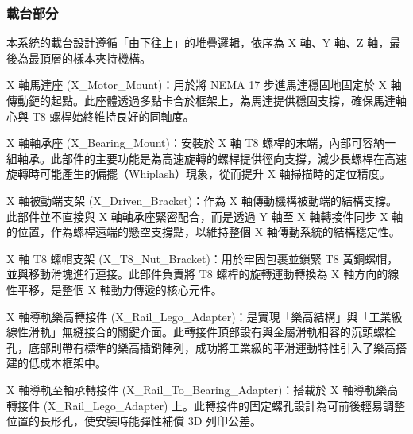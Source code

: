 
\subsubsection{載台部分}

本系統的載台設計遵循「由下往上」的堆疊邏輯，依序為 X 軸、Y 軸、Z 軸，最後為最頂層的樣本夾持機構。

X 軸馬達座 (X\_Motor\_Mount)：用於將 NEMA 17 步進馬達穩固地固定於 X 軸傳動鏈的起點。此座體透過多點卡合於框架上，為馬達提供穩固支撐，確保馬達軸心與 T8 螺桿始終維持良好的同軸度。

X 軸軸承座 (X\_Bearing\_Mount)：安裝於 X 軸 T8 螺桿的末端，內部可容納一組軸承。此部件的主要功能是為高速旋轉的螺桿提供徑向支撐，減少長螺桿在高速旋轉時可能產生的偏擺（Whiplash）現象，從而提升 X 軸掃描時的定位精度。

X 軸被動端支架 (X\_Driven\_Bracket)：作為 X 軸傳動機構被動端的結構支撐。此部件並不直接與 X 軸軸承座緊密配合，而是透過 Y 軸至 X 軸轉接件同步 X 軸的位置，作為螺桿遠端的懸空支撐點，以維持整個 X 軸傳動系統的結構穩定性。

X 軸 T8 螺帽支架 (X\_T8\_Nut\_Bracket)：用於牢固包裹並鎖緊 T8 黃銅螺帽，並與移動滑塊進行連接。此部件負責將 T8 螺桿的旋轉運動轉換為 X 軸方向的線性平移，是整個 X 軸動力傳遞的核心元件。

X 軸導軌樂高轉接件 (X\_Rail\_Lego\_Adapter)：是實現「樂高結構」與「工業級線性滑軌」無縫接合的關鍵介面。此轉接件頂部設有與金屬滑軌相容的沉頭螺栓孔，底部則帶有標準的樂高插銷陣列，成功將工業級的平滑運動特性引入了樂高搭建的低成本框架中。

X 軸導軌至軸承轉接件 (X\_Rail\_To\_Bearing\_Adapter)：搭載於 X 軸導軌樂高轉接件 (X\_Rail\_Lego\_Adapter) 上。此轉接件的固定螺孔設計為可前後輕易調整位置的長形孔，使安裝時能彈性補償 3D 列印公差。


